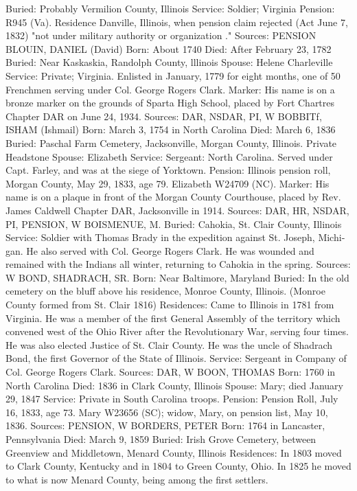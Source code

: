Buried: Probably Vermilion County, Illinois 
Service: Soldier; Virginia Pension: R945 (Va). 
Residence Danville, Illinois, when pension claim rejected (Act June 7, 1832) "not under military authority or organization ." 
Sources: PENSION 
BLOUIN, DANIEL (David) 
Born: About 1740 
Died: After February 23, 1782 
Buried: Near Kaskaskia, Randolph County, lllinois 
Spouse: Helene Charleville 
Service: Private; Virginia. Enlisted in January, 1779 for eight months, one of 50 Frenchmen serving under Col. George Rogers Clark. 
Marker: His name is on a bronze marker on the grounds of Sparta High School, placed by Fort Chartres Chapter DAR on June 24, 1934. 
Sources: DAR, NSDAR, PI, W 
BOBBITf, ISHAM (Ishmail) 
Born: March 3, 1754 in North Carolina 
Died: March 6, 1836 
Buried: Paschal Farm Cemetery, Jacksonville, Morgan County, Illinois. Private Headstone 
Spouse: Elizabeth 
Service: Sergeant: North Carolina. Served under Capt. Farley, and was at the siege of Yorktown. 
Pension: Illinois pension roll, Morgan County, May 29, 1833, age 79. Elizabeth W24709 (NC). 
Marker: His name is on a plaque in front of the Morgan County Courthouse, placed by Rev. James Caldwell Chapter DAR, Jacksonville in 1914. 
Sources: DAR, HR, NSDAR, PI, PENSION, W 
BOISMENUE, M. 
Buried: Cahokia, St. Clair County, Illinois 
Service: Soldier with Thomas Brady in the expedition against St. Joseph, Michi­gan. He also served with Col. George Rogers Clark. He was wounded and remained with the Indians all winter, returning to Cahokia in the spring. 
Sources: W 
BOND, SHADRACH, SR. 
Born: Near Baltimore, Maryland 
Buried: In the old cemetery on the bluff above his residence, Monroe County, Illinois. (Monroe County formed from St. Clair 1816) 
Residences: Came to Illinois in 1781 from Virginia. He was a member of the first General Assembly of the territory which convened west of the Ohio River after the Revolutionary War, serving four times. He was also elected Justice of St. Clair County. He was the uncle of Shadrach Bond, the first Governor of the State of Illinois. 
Service: Sergeant in Company of Col. George Rogers Clark. 
Sources: DAR, W 
BOON, THOMAS 
Born: 1760 in North Carolina 
Died: 1836 in Clark County, Illinois 
Spouse: Mary; died January 29, 1847 
Service: Private in South Carolina troops. 
Pension: Pension Roll, July 16, 1833, age 73. Mary W23656 (SC); widow, Mary, on pension list, May 10, 1836. 
Sources: PENSION, W 
BORDERS, PETER 
Born: 1764 in Lancaster, Pennsylvania 
Died: March 9, 1859 
Buried: Irish Grove Cemetery, between Greenview and Middletown, Menard County, Illinois 
Residences: In 1803 moved to Clark County, Kentucky and in 1804 to Green County, Ohio. In 1825 he moved to what is now Menard County, being among the first settlers. 
